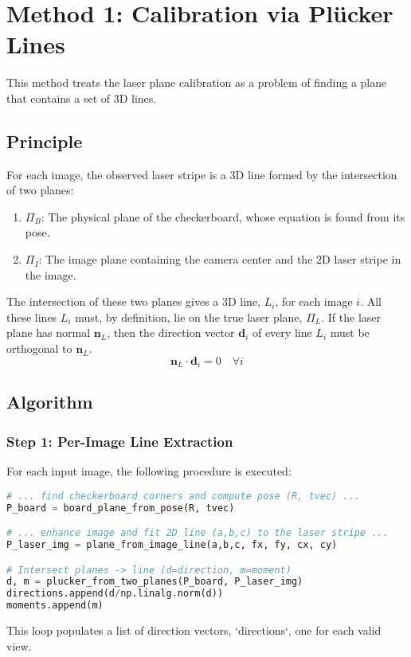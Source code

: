 \documentclass{article}
\begin{document}
\section{Method 1: Calibration via Pl\"ucker Lines}
This method treats the laser plane calibration as a problem of finding a plane that contains a set of 3D lines.

\subsection{Principle}
For each image, the observed laser stripe is a 3D line formed by the intersection of two planes:
\begin{enumerate}
    \item $\Pi_B$: The physical plane of the checkerboard, whose equation is found from its pose.
    \item $\Pi_I$: The image plane containing the camera center and the 2D laser stripe in the image.
\end{enumerate}
The intersection of these two planes gives a 3D line, $L_i$, for each image $i$. All these lines $L_i$ must, by definition, lie on the true laser plane, $\Pi_L$. If the laser plane has normal $\mathbf{n}_L$, then the direction vector $\mathbf{d}_i$ of every line $L_i$ must be orthogonal to $\mathbf{n}_L$.
\begin{equation}
\mathbf{n}_L \cdot \mathbf{d}_i = 0 \quad \forall i
\end{equation}

\subsection{Algorithm}
\subsubsection{Step 1: Per-Image Line Extraction}
For each input image, the following procedure is executed:
\begin{lstlisting}[language=Python]
# ... find checkerboard corners and compute pose (R, tvec) ...
P_board = board_plane_from_pose(R, tvec)

# ... enhance image and fit 2D line (a,b,c) to the laser stripe ...
P_laser_img = plane_from_image_line(a,b,c, fx, fy, cx, cy)

# Intersect planes -> line (d=direction, m=moment)
d, m = plucker_from_two_planes(P_board, P_laser_img)
directions.append(d/np.linalg.norm(d))
moments.append(m)
\end{lstlisting}
This loop populates a list of direction vectors, `directions`, one for each valid view.
\end{document}
